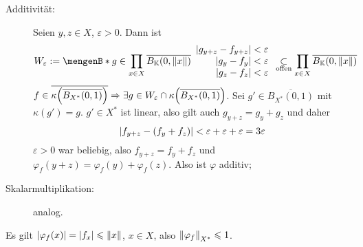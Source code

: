 \begin{description}
	\item[Additivität:] Seien $y,z \in X$, $\varepsilon>0$. Dann ist 
	\[
		W_\varepsilon := \set[g \in \prod_{x \in X} \overline{B_\mathds{K}(0, \norm{x} )} ]{\begin{array}{r}
			\abs*{g_{y+z}- f_{y+z}} < \varepsilon \\ \enspace\abs*{g_y-f_y} < \varepsilon \\ \enspace\abs*{g_z -f_z}  < \varepsilon
		\end{array}  }  
		\underset{\text{offen}}{\subset} \prod_{x \in X} \overline{B_\mathds{K}(0,\norm{x})} 
	\]
	$f \in \overline{\kappa \enbrace*{\overline{B_{X^*}(0,1)}}} \Rightarrow \exists g \in W_\varepsilon \cap \kappa \enbrace*{\overline{B_{X^*}(0,1)}}$. Sei 
	$g' \in \overline{B_{X^*}(0,1)}$ mit $\kappa(g')=g$. $g' \in X^*$ ist linear, also gilt auch $g_{y+z}= g_y + g_z$ und daher 
	\[
		\abs*{f_{y+z} - (f_y + f_z)} < \varepsilon + \varepsilon + \varepsilon= 3 \varepsilon
	\]
	$\varepsilon>0$ war beliebig, also $f_{y+z}= f_y+f_z$ und $\varphi_f(y+z)= \varphi_f(y)+ \varphi_f(z)$. Also ist $\varphi$ additiv;
	\item[Skalarmultiplikation:] analog.
\end{description}
Es gilt $\abs*{\varphi_f(x)} = \abs*{f_x} \le \norm{x}$, $x \in X$, also $\norm[X^*]{\varphi_f} \le 1$. \bewende

